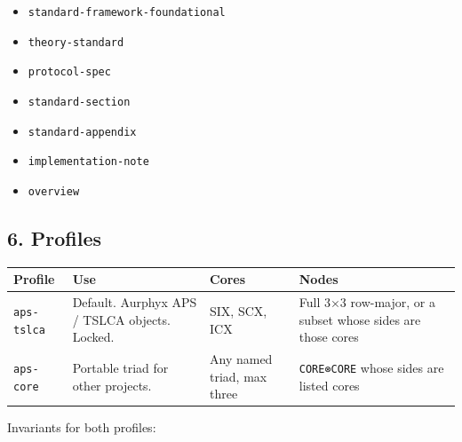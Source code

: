 \begin{itemize}
\tightlist
\item
  \texttt{standard-framework-foundational}
\item
  \texttt{theory-standard}
\item
  \texttt{protocol-spec}
\item
  \texttt{standard-section}
\item
  \texttt{standard-appendix}
\item
  \texttt{implementation-note}
\item
  \texttt{overview}
\end{itemize}

\subsection{6. Profiles}\label{profiles}

{\def\LTcaptype{none} %
\begin{longtable}[]{@{}
  >{\raggedright\arraybackslash}p{}
  >{\raggedright\arraybackslash}p{}
  >{\raggedright\arraybackslash}p{}
  >{\raggedright\arraybackslash}p{}@{}}
\toprule\noalign{}
\begin{minipage}[b]{\linewidth}\raggedright
Profile
\end{minipage} & \begin{minipage}[b]{\linewidth}\raggedright
Use
\end{minipage} & \begin{minipage}[b]{\linewidth}\raggedright
Cores
\end{minipage} & \begin{minipage}[b]{\linewidth}\raggedright
Nodes
\end{minipage} \\
\midrule\noalign{}
\endhead
\bottomrule\noalign{}
\endlastfoot
\texttt{aps-tslca} & Default. Aurphyx APS / TSLCA objects. Locked. & SIX, SCX, ICX & Full 3×3 row-major, or a subset whose sides are those cores \\
\texttt{aps-core} & Portable triad for other projects. & Any named triad, max three & \texttt{CORE⊗CORE} whose sides are listed cores \\
\end{longtable}
}

Invariants for both profiles:

